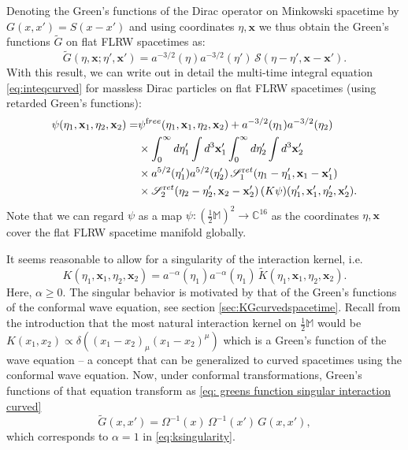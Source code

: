 \documentclass[b5paper,draft,openbib,12pt]{memoir}
\newcommand{\CC}{\mathbb{C}}
\newcommand{\M}{\mathbb{M}}
\newcommand{\vx}{\mathbf{x}}
\newcommand{\ret}{{\textup ret}}
\newcommand{\free}{{\textup free}}
\begin{document}
Denoting the Green's functions of the Dirac operator on Minkowski 
spacetime by $G(x,x')=S(x-x')$ and using coordinates $\eta, \vx$ 
we thus obtain the Green's functions $\widetilde{G}$ on flat FLRW 
spacetimes as:
\begin{equation}
	\widetilde{G}(\eta,\vx; \eta', \vx') = a^{-3/2}(\eta) a^{-3/2}(\eta')\, \mathscr{S}(\eta-\eta', \vx-\vx').
\end{equation}
With this result, we can write out in detail the multi-time integral 
equation \eqref{eq:inteqcurved} for massless Dirac particles on flat 
FLRW spacetimes (using retarded Green's functions):
\begin{align}\nonumber
  \psi(\eta_1,\vx_1,\eta_2,\vx_2) =& \psi^\free(\eta_1,\vx_1,\eta_2,\vx_2) + a^{-3/2}(\eta_1) a^{-3/2}(\eta_2) \\
  &\times \int_0^\infty d \eta_1' \int d^3 \vx_1' \int_0^\infty d \eta_2' \int d^3 \vx_2' \nonumber\\
  &\times a^{5/2}(\eta_1') a^{5/2}(\eta_2') \, \mathscr{S}_1^\ret(\eta_1-\eta_1', \vx_1-\vx_1')\\
  &\times \mathscr{S}_2^\ret(\eta_2-\eta_2',\vx_2-\vx_2') \, (K \psi)(\eta_1',\vx_1',\eta_2',\vx_2').
\end{align}
Note that we can regard $\psi$ as a map 
$\psi : (\frac{1}{2}\M)^2 \rightarrow \CC^{16}$ as the coordinates 
$\eta, \vx$ cover the flat FLRW spacetime manifold globally.

It seems reasonable to allow for a singularity of the interaction 
kernel, i.e.\
\begin{equation}
	K(\eta_1,\vx_1,\eta_2,\vx_2) = a^{-\alpha}(\eta_1)  a^{-\alpha}(\eta_1) \, \widetilde{K}(\eta_1,\vx_1,\eta_2,\vx_2).
	\label{eq:ksingularity}
\end{equation}
Here, $\alpha \geq 0$. The singular behavior is motivated by that of 
the Green's functions of the conformal wave equation, 
see section \ref{sec:KGcurvedspacetime}. 
Recall from the introduction that the most 
natural interaction kernel on $\frac{1}{2}\M$ would be 
$K(x_1,x_2)\propto \delta((x_1-x_2)_\mu(x_1-x_2)^\mu)$ which is a 
Green's function of the wave equation -- a concept that can be 
generalized to curved spacetimes using the conformal wave equation. 
Now, under conformal transformations, Green's functions of that 
equation transform as \eqref{eq: greens function singular interaction curved}
\begin{equation}
	\widetilde{G}(x,x') = \Omega^{-1}(x) \,\Omega^{-1}(x') \, G(x,x'),
\end{equation}
which corresponds to $\alpha = 1$ in \eqref{eq:ksingularity}.
\end{document}
